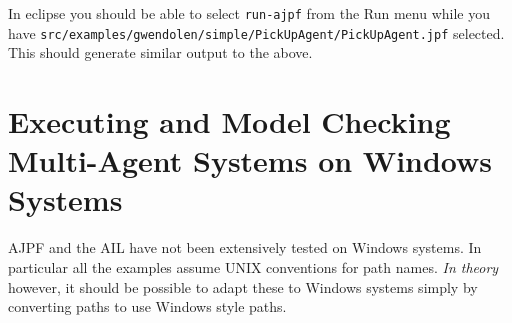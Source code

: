 In eclipse you should be able to select \texttt{run-ajpf} from the Run menu while you have \texttt{src/examples/gwendolen/simple/PickUpAgent/PickUpAgent.jpf} selected.  This should generate similar output to the above.

\section{Executing and Model Checking Multi-Agent Systems on Windows Systems}

AJPF and the AIL have not been extensively tested on Windows systems.  In particular all the examples assume UNIX conventions for path names.  \emph{In theory} however, it should be possible to adapt these to Windows systems simply by converting paths to use Windows style paths.

